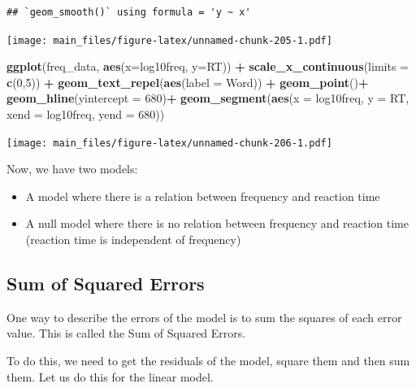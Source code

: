 \documentclass[
]{book}
\newenvironment{Shaded}{\begin{snugshade}}{\end{snugshade}}
\newcommand{\AttributeTok}[1]{\textcolor[rgb]{0.13,0.29,0.53}{#1}}
\newcommand{\DecValTok}[1]{\textcolor[rgb]{0.00,0.00,0.81}{#1}}
\newcommand{\FunctionTok}[1]{\textcolor[rgb]{0.13,0.29,0.53}{\textbf{#1}}}
\newcommand{\NormalTok}[1]{#1}
\newcommand{\SpecialCharTok}[1]{\textcolor[rgb]{0.81,0.36,0.00}{\textbf{#1}}}
\providecommand{\tightlist}{%
  \setlength{\itemsep}{0pt}\setlength{\parskip}{0pt}}
\begin{document}
\begin{verbatim}
## `geom_smooth()` using formula = 'y ~ x'
\end{verbatim}

\texttt{[image: main\_files/figure-latex/unnamed-chunk-205-1.pdf]}

\begin{Shaded}
\begin{Highlighting}[]
\FunctionTok{ggplot}\NormalTok{(freq\_data, }\FunctionTok{aes}\NormalTok{(}\AttributeTok{x=}\NormalTok{log10freq, }\AttributeTok{y=}\NormalTok{RT)) }\SpecialCharTok{+}
  \FunctionTok{scale\_x\_continuous}\NormalTok{(}\AttributeTok{limits =} \FunctionTok{c}\NormalTok{(}\DecValTok{0}\NormalTok{,}\DecValTok{5}\NormalTok{)) }\SpecialCharTok{+}
  \FunctionTok{geom\_text\_repel}\NormalTok{(}\FunctionTok{aes}\NormalTok{(}\AttributeTok{label =}\NormalTok{ Word)) }\SpecialCharTok{+}
  \FunctionTok{geom\_point}\NormalTok{()}\SpecialCharTok{+}
  \FunctionTok{geom\_hline}\NormalTok{(}\AttributeTok{yintercept =} \DecValTok{680}\NormalTok{)}\SpecialCharTok{+}
  \FunctionTok{geom\_segment}\NormalTok{(}\FunctionTok{aes}\NormalTok{(}\AttributeTok{x =}\NormalTok{ log10freq, }\AttributeTok{y =}\NormalTok{ RT,}
                   \AttributeTok{xend =}\NormalTok{ log10freq, }\AttributeTok{yend =} \DecValTok{680}\NormalTok{))}
\end{Highlighting}
\end{Shaded}

\texttt{[image: main\_files/figure-latex/unnamed-chunk-206-1.pdf]}

Now, we have two models:

\begin{itemize}
\tightlist
\item
  A model where there is a relation between frequency and reaction time
\item
  A null model where there is no relation between frequency and reaction time (reaction time is independent of frequency)
\end{itemize}

\hypertarget{sum-of-squared-errors}{%
\subsection{Sum of Squared Errors}\label{sum-of-squared-errors}}

One way to describe the errors of the model is to sum the squares of each error value. This is called the Sum of Squared Errors.

To do this, we need to get the residuals of the model, square them and then sum them. Let us do this for the linear model.
\end{document}
